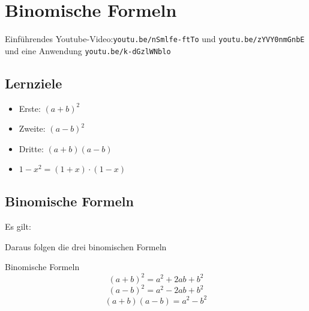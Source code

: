 \newpage
\section{Binomische Formeln}



Einführendes Youtube-Video:\texttt{youtu.be/nSmlfe-ftTo} und \texttt{youtu.be/zYVY0nmGnbE} und eine Anwendung
\texttt{youtu.be/k-dGzlWNblo}

\subsection*{Lernziele}

\begin{itemize}
\item Erste:  $(a+b)^2$ 
\item Zweite: $(a-b)^2$
\item Dritte: $(a+b)(a-b)$
\item $1-x^2 = (1+x)\cdot{}(1-x)$


\end{itemize}
\newpage


\subsection{Binomische Formeln}
Es gilt:


Daraus folgen die drei binomischen Formeln
\begin{gesetz}{Binomische Formeln}{}
$$(a+b)^2 = a^2 + 2ab +b^2$$
\vspace{0.01mm}
$$(a-b)^2 = a^2 - 2ab +b^2$$
\vspace{0.2mm}
$$(a+b)(a-b) = a^2 - b^2$$
\end{gesetz}


